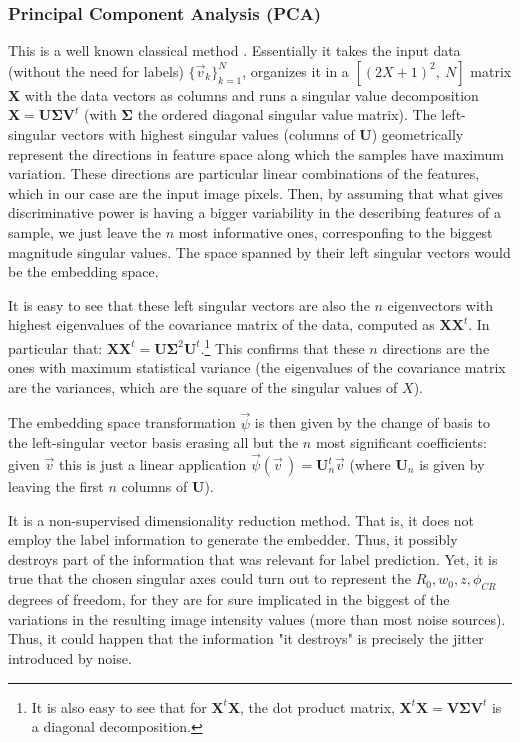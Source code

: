 \documentclass[11pt, a4paper, twoside]{article} %
\DeclareRobustCommand{\mybox}[2][gray!10]{%
\begin{tcolorbox}[   %
        left=0.2cm,
        right=0.2cm,
        top=0.15cm,
        bottom=0.15cm,
        colback=#1,
        colframe=#1,
        width=\dimexpr\textwidth\relax, 
        enlarge left by=0mm,
        boxsep=5pt,
        arc=0pt,outer arc=0pt,
        ]
        #2
\end{tcolorbox}
}
\begin{document}
\subsubsection*{Principal Component Analysis (PCA)}
This is a well known classical method  \cite{PCA}. Essentially it takes the input data (without the need for labels) $\{\vec{v}_k\}_{k=1}^N$, organizes it in a $[(2X+1)^2,\ N]$ matrix $\pmb{X}$ with the data vectors as columns and runs a singular value decomposition $\pmb{X}=\pmb{U}\pmb{\Sigma}\pmb{V}^t$ (with $\pmb{\Sigma}$ the ordered diagonal singular value matrix). The left-singular vectors with highest singular values (columns of $\pmb{U}$) geometrically represent the directions in feature space along which the samples have maximum variation. These directions are particular linear combinations of the features, which in our case are the input image pixels. Then, by assuming that what gives discriminative power is having a bigger variability in the describing features of a sample, we just leave the $n$ most informative ones, corresponfing to the biggest magnitude singular values. The space spanned by their left singular vectors would be the embedding space. 
\mybox{
It is easy to see that these left singular vectors are also the $n$ eigenvectors with highest eigenvalues of the covariance matrix of the data, computed as $\pmb{X}\pmb{X}^t$. In particular that: $\pmb{X}\pmb{X}^t=\pmb{U}\pmb{\Sigma}^2\pmb{U}^t$.\footnote{It is also easy to see that for $\pmb{X}^t\pmb{X}$, the dot product matrix, $\pmb{X}^t\pmb{X}=\pmb{V}\pmb{\Sigma}\pmb{V}^t$ is a diagonal decomposition.} This confirms that these $n$ directions are the ones with maximum statistical variance (the eigenvalues of the covariance matrix are the variances, which are the square of the singular values of $X$).\vspace{0.13cm}

The embedding space transformation $\vec{\psi}$ is then given by the change of basis to the left-singular vector basis erasing all but the $n$ most significant coefficients: given $\vec{v}$ this is just a linear application $\vec{\psi}(\vec{v}\,)=\pmb{U}_{n}^t\vec{v}$ (where $\pmb{U}_{n}$ is given by leaving the first $n$ columns of $\pmb{U}$). \vspace{0.13cm}
}

It is a non-supervised dimensionality reduction method. That is, it does not employ the label information to generate the embedder. Thus, it possibly destroys part of the information that was relevant for label prediction. Yet, it is true that the chosen singular axes could turn out to represent the $R_0,w_0,z,\phi_{CR}$ degrees of freedom, for they are for sure implicated in the biggest of the variations in the resulting image intensity values (more than most noise sources). Thus, it could happen that the information "it destroys" is precisely the jitter introduced by noise.
\end{document}
